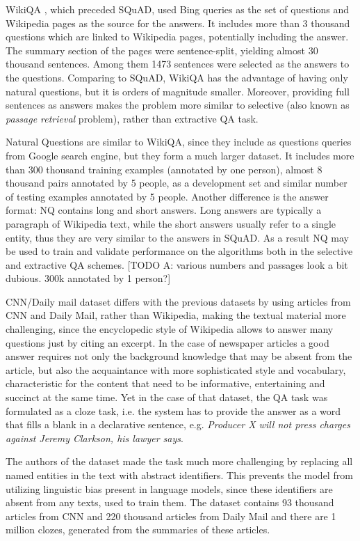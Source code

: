 WikiQA \cite{yang2015wikiqa}, which preceded SQuAD, used Bing queries as the set of questions and Wikipedia pages as the source for the answers. It includes more than 3 thousand questions which are linked to Wikipedia pages, potentially including the answer. The summary section of the pages were sentence-split, yielding almost 30 thousand sentences. Among them 1473 sentences were selected as the answers to the questions. Comparing to SQuAD, WikiQA has the advantage of having only natural questions, but it is orders of magnitude smaller. Moreover, providing full sentences as answers makes the problem more similar to selective (also known as \textit{passage retrieval} problem), rather than extractive QA task.

Natural Questions \cite{kwiatkowski2019natural} are similar to WikiQA, since they include as questions queries from Google search engine, but they form a much larger dataset. It includes more than 300 thousand training examples (annotated by one person), almost 8 thousand pairs annotated by 5 people, as a development set and  similar number of testing examples annotated by 5 people. Another difference is the answer format: NQ contains long and short answers. Long answers are typically a paragraph of Wikipedia text, while the short answers usually refer to a single entity, thus they
are very similar to the answers in SQuAD. As a result NQ may be used to train and validate performance on the algorithms both in the selective and extractive QA schemes. [TODO A: various numbers and passages look a bit dubious. 300k annotated by 1 person?]

CNN/Daily mail dataset \cite{hermann2015teaching} differs with the previous datasets by using articles from CNN and Daily Mail, rather than Wikipedia, making the textual material more challenging, since the encyclopedic style of Wikipedia allows to answer many questions just by citing an excerpt. In the case of newspaper articles a good answer requires not only the background knowledge that may be absent from the article, but also the acquaintance with more
sophisticated style and vocabulary, characteristic for the content that need to be informative, entertaining and succinct at the same time. Yet in the case of that dataset, the QA task was formulated as a cloze task, i.e. the system has to provide the answer as a word that fills a blank in a declarative sentence, e.g. \textit{Producer X will not press charges against Jeremy Clarkson, his lawyer says}.

The authors of the dataset made the task much more challenging by replacing all named entities in the text with abstract identifiers. This prevents the model from utilizing linguistic bias present in language models, since these identifiers are absent from any texts, used to train them. The dataset
contains 93 thousand articles from CNN and 220 thousand articles from Daily Mail and there are 1 million clozes, generated from the summaries of these articles.

